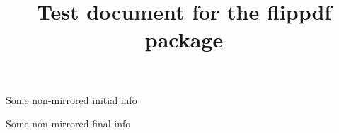 \documentclass[a4paper]{article}
\title{Test document for the flippdf package}
\begin{document}
\thispagestyle{empty}
{\Large Some non-mirrored initial info}

\bigskip

\lipsum[1]

\maketitle
\setcounter{page}{1}
\FlipPDF
\lipsum[2-6]

\clearpage
\UnFlipPDF
\thispagestyle{empty}
{\Large Some non-mirrored final info}

\bigskip

\lipsum[7]
\end{document}
